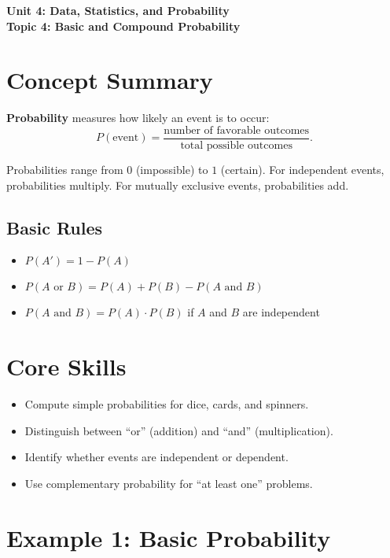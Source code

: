 \documentclass[12pt]{article}
\begin{document}
\begin{center}
    \LARGE \textbf{Unit 4: Data, Statistics, and Probability} \\[6pt]
    \Large \textbf{Topic 4: Basic and Compound Probability}
\end{center}

\vspace{1em}

\section*{Concept Summary}

\textbf{Probability} measures how likely an event is to occur:
\[
P(\text{event}) = \frac{\text{number of favorable outcomes}}{\text{total possible outcomes}}.
\]

Probabilities range from \(0\) (impossible) to \(1\) (certain).  
For independent events, probabilities multiply.  
For mutually exclusive events, probabilities add.

\subsection*{Basic Rules}
\begin{itemize}
  \item \(P(A') = 1 - P(A)\)
  \item \(P(A\text{ or }B) = P(A) + P(B) - P(A\text{ and }B)\)
  \item \(P(A\text{ and }B) = P(A)\cdot P(B)\) if \(A\) and \(B\) are independent
\end{itemize}

\section*{Core Skills}
\begin{itemize}
  \item Compute simple probabilities for dice, cards, and spinners.
  \item Distinguish between “or” (addition) and “and” (multiplication).
  \item Identify whether events are independent or dependent.
  \item Use complementary probability for “at least one” problems.
\end{itemize}

\section*{Example 1: Basic Probability}
\end{document}
